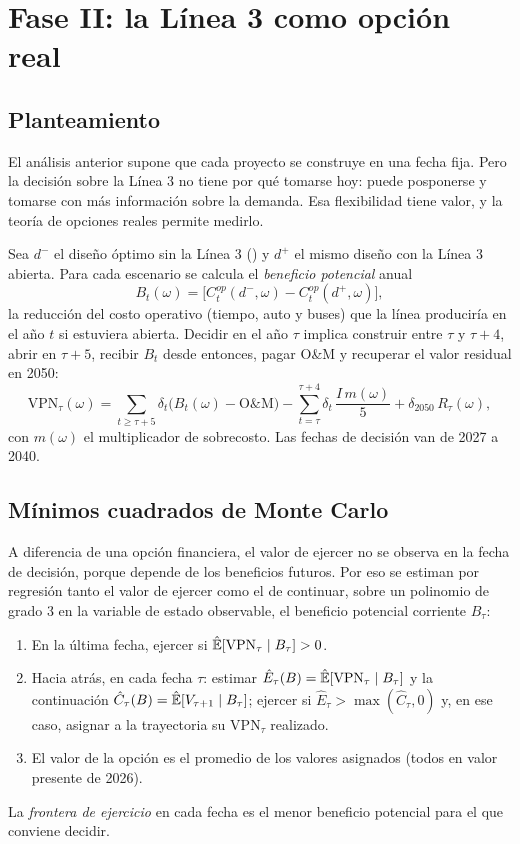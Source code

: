 \chapter{Fase II: la Línea 3 como opción real}\label{cap:opciones}

\section{Planteamiento}

El análisis anterior supone que cada proyecto se construye en una fecha fija. Pero la decisión sobre la
Línea 3 no tiene por qué tomarse hoy: puede posponerse y tomarse con más información sobre la demanda.
Esa flexibilidad tiene valor, y la teoría de opciones reales permite medirlo.

Sea $d^-$ el diseño óptimo sin la Línea 3 (\OptimoNeutral) y $d^+$ el mismo diseño con la Línea 3
abierta. Para cada escenario se calcula el \emph{beneficio potencial} anual
\begin{equation}
B_t(\omega)=\big[C^{op}_t(d^-,\omega)-C^{op}_t(d^+,\omega)\big],
\end{equation}
la reducción del costo operativo (tiempo, auto y buses) que la línea produciría en el año $t$ si
estuviera abierta. Decidir en el año $\tau$ implica construir entre $\tau$ y $\tau+4$, abrir en
$\tau+5$, recibir $B_t$ desde entonces, pagar O\&M y recuperar el valor residual en 2050:
\begin{equation}\label{eq:vpn_tau}
\mathrm{VPN}_\tau(\omega)=\sum_{t\ge\tau+5}\delta_t\big(B_t(\omega)-\mathrm{O\&M}\big)
-\sum_{t=\tau}^{\tau+4}\delta_t\,\frac{I\,m(\omega)}{5}+\delta_{2050}\,R_\tau(\omega),
\end{equation}
con $m(\omega)$ el multiplicador de sobrecosto. Las fechas de decisión van de 2027 a 2040.

\section{Mínimos cuadrados de Monte Carlo}

A diferencia de una opción financiera, el valor de ejercer no se observa en la fecha de decisión,
porque depende de los beneficios futuros. Por eso se estiman por regresión tanto el valor de ejercer como
el de continuar, sobre un polinomio de grado 3 en la variable de estado observable, el beneficio
potencial corriente $B_\tau$:
\begin{enumerate}[nosep]
\item En la última fecha, ejercer si $\hat{\mathbb{E}}[\mathrm{VPN}_\tau\mid B_\tau]>0$.
\item Hacia atrás, en cada fecha $\tau$: estimar $\hat E_\tau(B)=\hat{\mathbb{E}}[\mathrm{VPN}_\tau\mid B_\tau]$ y
      la continuación $\hat C_\tau(B)=\hat{\mathbb{E}}[V_{\tau+1}\mid B_\tau]$; ejercer si
      $\hat E_\tau>\max(\hat C_\tau,0)$ y, en ese caso, asignar a la trayectoria su
      $\mathrm{VPN}_\tau$ realizado.
\item El valor de la opción es el promedio de los valores asignados (todos en valor presente de 2026).
\end{enumerate}
La \emph{frontera de ejercicio} en cada fecha es el menor beneficio potencial para el que conviene
decidir.

